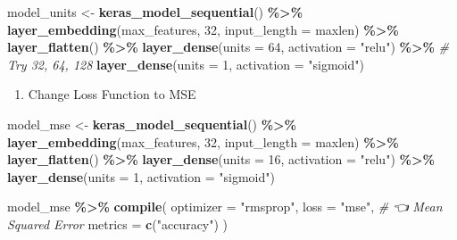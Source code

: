 \documentclass[
]{article}
\newenvironment{Shaded}{\begin{snugshade}}{\end{snugshade}}
\newcommand{\AttributeTok}[1]{\textcolor[rgb]{0.13,0.29,0.53}{#1}}
\newcommand{\CommentTok}[1]{\textcolor[rgb]{0.56,0.35,0.01}{\textit{#1}}}
\newcommand{\DecValTok}[1]{\textcolor[rgb]{0.00,0.00,0.81}{#1}}
\newcommand{\FunctionTok}[1]{\textcolor[rgb]{0.13,0.29,0.53}{\textbf{#1}}}
\newcommand{\NormalTok}[1]{#1}
\newcommand{\OtherTok}[1]{\textcolor[rgb]{0.56,0.35,0.01}{#1}}
\newcommand{\SpecialCharTok}[1]{\textcolor[rgb]{0.81,0.36,0.00}{\textbf{#1}}}
\newcommand{\StringTok}[1]{\textcolor[rgb]{0.31,0.60,0.02}{#1}}
\providecommand{\tightlist}{%
  \setlength{\itemsep}{0pt}\setlength{\parskip}{0pt}}
\begin{document}
\begin{Shaded}
\begin{Highlighting}[]
\NormalTok{model\_units }\OtherTok{\textless{}{-}} \FunctionTok{keras\_model\_sequential}\NormalTok{() }\SpecialCharTok{\%\textgreater{}\%}
  \FunctionTok{layer\_embedding}\NormalTok{(max\_features, }\DecValTok{32}\NormalTok{, }\AttributeTok{input\_length =}\NormalTok{ maxlen) }\SpecialCharTok{\%\textgreater{}\%}
  \FunctionTok{layer\_flatten}\NormalTok{() }\SpecialCharTok{\%\textgreater{}\%}
  \FunctionTok{layer\_dense}\NormalTok{(}\AttributeTok{units =} \DecValTok{64}\NormalTok{, }\AttributeTok{activation =} \StringTok{"relu"}\NormalTok{) }\SpecialCharTok{\%\textgreater{}\%}   \CommentTok{\# Try 32, 64, 128}
  \FunctionTok{layer\_dense}\NormalTok{(}\AttributeTok{units =} \DecValTok{1}\NormalTok{, }\AttributeTok{activation =} \StringTok{"sigmoid"}\NormalTok{)}
\end{Highlighting}
\end{Shaded}

\begin{enumerate}
\def\labelenumi{\arabic{enumi}.}
\setcounter{enumi}{2}
\tightlist
\item
  Change Loss Function to MSE
\end{enumerate}

\begin{Shaded}
\begin{Highlighting}[]
\NormalTok{model\_mse }\OtherTok{\textless{}{-}} \FunctionTok{keras\_model\_sequential}\NormalTok{() }\SpecialCharTok{\%\textgreater{}\%}
  \FunctionTok{layer\_embedding}\NormalTok{(max\_features, }\DecValTok{32}\NormalTok{, }\AttributeTok{input\_length =}\NormalTok{ maxlen) }\SpecialCharTok{\%\textgreater{}\%}
  \FunctionTok{layer\_flatten}\NormalTok{() }\SpecialCharTok{\%\textgreater{}\%}
  \FunctionTok{layer\_dense}\NormalTok{(}\AttributeTok{units =} \DecValTok{16}\NormalTok{, }\AttributeTok{activation =} \StringTok{"relu"}\NormalTok{) }\SpecialCharTok{\%\textgreater{}\%}
  \FunctionTok{layer\_dense}\NormalTok{(}\AttributeTok{units =} \DecValTok{1}\NormalTok{, }\AttributeTok{activation =} \StringTok{"sigmoid"}\NormalTok{)}

\NormalTok{model\_mse }\SpecialCharTok{\%\textgreater{}\%} \FunctionTok{compile}\NormalTok{(}
  \AttributeTok{optimizer =} \StringTok{"rmsprop"}\NormalTok{,}
  \AttributeTok{loss =} \StringTok{"mse"}\NormalTok{,   }\CommentTok{\# 👈 Mean Squared Error}
  \AttributeTok{metrics =} \FunctionTok{c}\NormalTok{(}\StringTok{"accuracy"}\NormalTok{)}
\NormalTok{)}
\end{Highlighting}
\end{Shaded}
\end{document}
